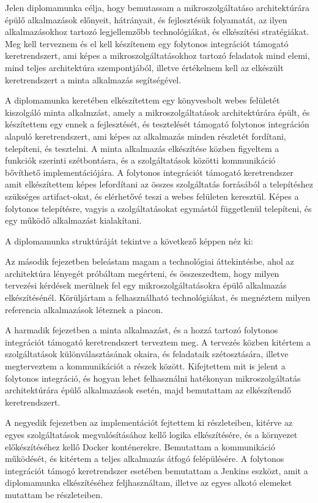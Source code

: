 \documentclass[11pt,magyar,a4paper,twoside,]{report}
\begin{document}
Jelen diplomamunka célja, hogy bemutassam a mikroszolgáltatáso
architektúrára épülő alkalmazások előnyeit, hátrányait, és fejlesztésük
folyamatát, az ilyen alkalmazásokhoz tartozó legjellemzőbb
technológiákat, és elkészítési stratégiákat. Meg kell terveznem és el
kell készítenem egy folytonos integrációt támogató keretrendszert, ami
képes a mikroszolgáltatásokhoz tartozó feladatok mind elemi, mind teljes
architektúra szempontjából, illetve értékelnem kell az elkészült
keretrendszert a minta alkalmazás segítségével.

A diplomamunka keretében elkészítettem egy könyvesbolt webes felületét
kiszolgáló minta alkalmzást, amely a mikroszolgáltatások architektúrára
épült, és készítettem egy ennek a fejlesztését, és tesztelését támogató
folytonos integráción alapuló keretrendszert, ami képes az alkalmazás
minden részletét fordítani, telepíteni, és tesztelni. A minta alkalmazás
elkészítése közben figyeltem a funkciók szerinti szétbontásra, és a
szolgáltatások közötti kommunikáció bővíthető implementációjára. A
folytonos integrációt támogató keretrendszer amit elkészítettem képes
lefordítani az összes szolgáltatás forrásából a telepítéshez szükséges
artifact-okat, és elérhetővé teszi a webes felületen keresztül. Képes a
folytonos telepítésre, vagyis a szolgáltatásokat egymástól függetlenül
telepíteni, és egy működő alkalmazást kialakítani.

A diplomamunka struktúráját tekintve a következő képpen néz ki:

Az második fejezetben beleástam magam a technológiai áttekintésbe, ahol
az architektúra lényegét próbáltam megérteni, és összeszedtem, hogy
milyen tervezési kérdések merülnek fel egy mikroszolgáltatásokra épülő
alkalmazás elkészítésénél. Körüljártam a felhasználható technológiákat,
és megnéztem milyen referencia alkalmazások léteznek a piacon.

A harmadik fejezetben a minta alkalmazást, és a hozzá tartozó folytonos
integrációt támogató keretrendszert terveztem meg. A tervezés közben
kitértem a szolgáltatások különválasztásának okaira, és feladataik
szétosztására, illetve megterveztem a kommunikációt a részek között.
Kifejtettem mit is jelent a folytonos integráció, és hogyan lehet
felhasználni hatékonyan mikroszolgáltatás architektúrára épülő
alkalmazások esetén, majd bemutattam az elkészítendő keretrendszert.

A negyedik fejezetben az implementációt fejtettem ki részleteiben,
kitérve az egyes szolgáltatások megvalósításához kellő logika
elkészítésére, és a környezet előkészítéséhez kellő Docker konténerekre.
Bemutattam a kommunikáció működését, és kitértem a teljes alkalmazás
átfogó felépülésére. A folytonos integrációt támogó keretrendszer
esetében bemutattam a Jenkins eszközt, amit a diplomamunka
elkészítéséhez feljhasználtam, illetve az egyes alkotó elemeket mutattam
be részleteiben.
\end{document}
